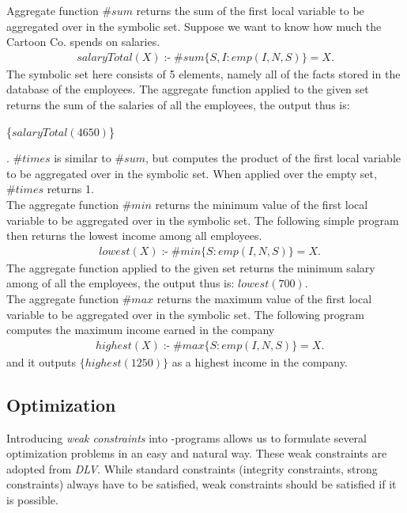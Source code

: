 \documentclass[14pt,a4paper, titlepage]{article}
\DeclareMathOperator{\leftimpl}{:-}
\begin{document}
\bigskip Aggregate function $\mathit{\#sum}$ returns the sum of the first local variable to be aggregated over in the symbolic set. Suppose we want to know how much the Cartoon Co. spends on salaries.
\begin{align*}
\mathit{salaryTotal(X)} \leftimpl \mathit{\#sum}\{S,I : \mathit{emp(I,N,S)}\} = X.
\end{align*}
The symbolic set here consists of 5 elements, namely all of the facts stored in the database of the employees. The aggregate function applied to the given set returns the sum of the salaries of all the employees, the output thus is: \\ \centerline{
\{$\mathit{salaryTotal(4650)}$\}}. $\mathit{\#times}$ is similar to $\mathit{\#sum}$, but computes the product of the first local variable to be aggregated over in the symbolic set. When applied over the empty set, $\mathit{\#times}$ returns 1.
\bigskip \\The aggregate function $\mathit{\#min}$ returns the minimum value of the first local variable to be aggregated over in the symbolic set. The following simple program then returns the lowest income among all employees.
\begin{align*}
& lowest(X) \leftimpl \#min\{S : emp(I,N,S)\} = X.
\end{align*}
The aggregate function applied to the given set returns the minimum salary among of all the employees, the output thus is:
{$\mathit{lowest(700)}$}.
\bigskip \\The aggregate function $\mathit{\#max}$ returns the maximum value of the first local variable to be aggregated over in the symbolic set. The following program computes the maximum income earned in the company
\begin{align*}
& \mathit{highest}(X) \leftimpl \mathit{\#max}\{S : \mathit{emp}(I,N,S)\} = X.
\end{align*}
and it outputs $\{highest(1250)\}$ as a highest income in the company.

\subsection{Optimization}
\label{optimize}
Introducing \emph{weak constraints} into \hex-programs allows us to formulate several optimization problems in an easy and natural way. These weak constraints are adopted from \emph{DLV}. While standard constraints (integrity constraints, strong constraints) always have to be satisfied, weak constraints should be satisfied if it is possible.
\end{document}
